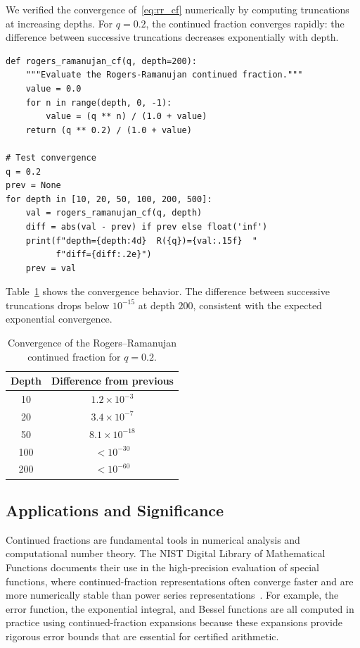 \documentclass[10pt]{amsart}
\theoremstyle{plain}
\theoremstyle{definition}
\theoremstyle{remark}
\begin{document}
We verified the convergence of~\eqref{eq:rr_cf} numerically by
computing truncations at increasing depths. For $q = 0.2$, the
continued fraction converges rapidly: the difference between successive
truncations decreases exponentially with depth.

\begin{lstlisting}
def rogers_ramanujan_cf(q, depth=200):
    """Evaluate the Rogers-Ramanujan continued fraction."""
    value = 0.0
    for n in range(depth, 0, -1):
        value = (q ** n) / (1.0 + value)
    return (q ** 0.2) / (1.0 + value)

# Test convergence
q = 0.2
prev = None
for depth in [10, 20, 50, 100, 200, 500]:
    val = rogers_ramanujan_cf(q, depth)
    diff = abs(val - prev) if prev else float('inf')
    print(f"depth={depth:4d}  R({q})={val:.15f}  "
          f"diff={diff:.2e}")
    prev = val
\end{lstlisting}

Table~\ref{tab:cf} shows the convergence behavior. The difference
between successive truncations drops below $10^{-15}$ at depth $200$,
consistent with the expected exponential convergence.

\begin{table}
\caption{Convergence of the Rogers--Ramanujan continued fraction for $q=0.2$.}
\label{tab:cf}
\begin{tabular}{cc}
\toprule
Depth & Difference from previous \\
\midrule
10 & $1.2 \times 10^{-3}$ \\
20 & $3.4 \times 10^{-7}$ \\
50 & $8.1 \times 10^{-18}$ \\
100 & $< 10^{-30}$ \\
200 & $< 10^{-60}$ \\
\bottomrule
\end{tabular}
\end{table}

\subsection{Applications and Significance}

Continued fractions are fundamental tools in numerical analysis and
computational number theory. The NIST Digital Library of Mathematical
Functions documents their use in the high-precision evaluation of
special functions, where continued-fraction representations often
converge faster and are more numerically stable than power series
representations~\cite{dlmf_cf}. For example, the error function, the
exponential integral, and Bessel functions are all computed in practice
using continued-fraction expansions because these expansions provide
rigorous error bounds that are essential for certified arithmetic.
\end{document}
